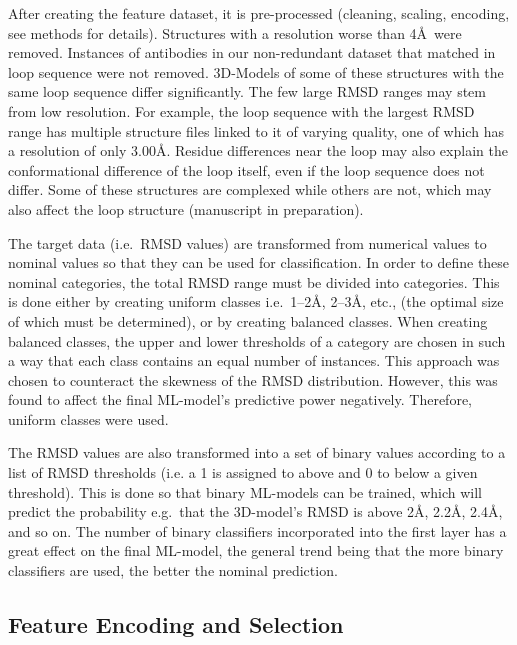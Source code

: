 \documentclass[12pt]{article}
\begin{document}
After creating the feature dataset, it is pre-processed (cleaning,
scaling, encoding, see methods for details). Structures with a
resolution worse than 4\AA\ were removed.
Instances of antibodies in our non-redundant dataset that matched in loop sequence were
not removed. 3D-Models of some of these structures with the same loop
sequence differ significantly. The few large RMSD ranges may stem from
low resolution. For example, the loop sequence with the largest RMSD range 
has multiple structure files linked to it of varying quality, one of which has a resolution of only 3.00\AA. Residue differences near the loop may also
explain the conformational difference of the loop itself, 
even if the loop sequence does not differ. Some of these structures are
complexed while others are not, which may also affect the loop
structure (manuscript in preparation).


The target data (i.e.\ RMSD values) are transformed from numerical
values to nominal values so that they can be used for
classification. In order to define these nominal categories, the total
RMSD range must be divided into categories. This is done either by
creating uniform classes i.e.\ 1--2\AA, 2--3\AA, etc., (the optimal size of which
must be determined), or by creating balanced classes. When
creating balanced classes, the upper and lower thresholds of a
category are chosen in such a way that each class contains an equal
number of instances. This approach was chosen to counteract the
skewness of the RMSD distribution. However, this was found to
affect the final ML-model's predictive power negatively. Therefore,
uniform classes were used.

The RMSD values are also transformed into a set of binary values according to a
list of RMSD thresholds (i.e. a 1 is assigned to above and 0 to below a given threshold). This is done so that binary ML-models can be
trained, which will predict the probability e.g.\ that the 3D-model's RMSD
is above 2\AA, 2.2\AA, 2.4\AA, and so on. The number of binary
classifiers incorporated into the first layer has a great effect on
the final ML-model, the general trend being that the more binary
classifiers are used, the better the nominal prediction. 

\subsection{Feature Encoding and Selection}
\end{document}
